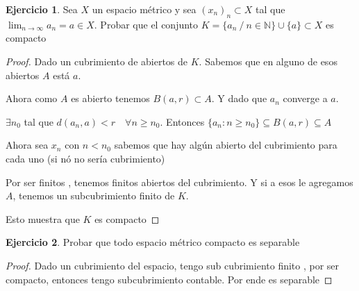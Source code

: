 \documentclass[11pt]{report}
\newcommand{\N}{\mathbb{N}}
\newcommand{\ra}{\rightarrow}
\theoremstyle{definition}
\newtheorem{ej}{Ejercicio}
\begin{document}
	\begin{ej}
		Sea $X$ un espacio métrico y sea $(x_n)_n \subset X$ tal que $\lim_{n\ra\infty } a_n = a \in X$. Probar que el conjunto $K = \{a_n \ / \ n \in \N\} \cup \{a\} \subset X$ es compacto
		\begin{proof}
 			Dado un cubrimiento de abiertos de $K$. Sabemos que en alguno de esos abiertos $A$ está $a$. 

			Ahora como $A$ es abierto tenemos $B(a,r) \subset A$. Y dado que $a_n$ converge a $a$. 

			$\exists n_0$ tal que $d(a_n,a) < r \quad \forall n \geq n_0$. Entonces $\{a_n : n \geq n_0\} \subseteq B(a,r) \subseteq A$

			Ahora sea $x_n$ con $n < n_0$ sabemos que hay algún abierto del cubrimiento para cada uno (si nó no sería cubrimiento)

			Por ser finitos , tenemos finitos abiertos del cubrimiento. Y si a esos le agregamos $A$, tenemos un subcubrimiento finito de $K$. 

			Esto muestra que $K$ es compacto
				
		\end{proof}
	\end{ej}
	
	\begin{ej}
		Probar que todo espacio métrico compacto es separable
		\begin{proof}
			Dado un cubrimiento del espacio, tengo sub cubrimiento finito , por ser compacto,  entonces tengo subcubrimiento contable. Por ende es separable	
		\end{proof}
	\end{ej}
\end{document}
